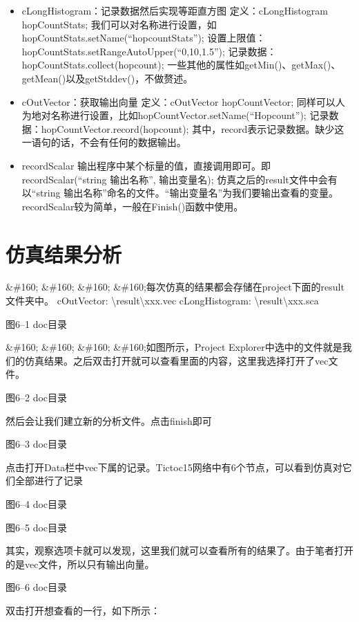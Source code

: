 \begin{itemize}
\item cLongHistogram：记录数据然后实现等距直方图 
定义：cLongHistogram hopCountStats;
我们可以对名称进行设置，如hopCountStats.setName(“hopcountStats”);
设置上限值：hopCountStats.setRangeAutoUpper(“0,10,1.5”);
记录数据：hopCountStats.collect(hopcount);
一些其他的属性如getMin()、getMax()、getMean()以及getStddev()，不做赘述。

\item cOutVector：获取输出向量
定义：cOutVector hopCountVector;
同样可以人为地对名称进行设置，比如hopCountVector.setName(“Hopcount”);
记录数据：hopCountVector.record(hopcount);
其中，record表示记录数据。缺少这一语句的话，不会有任何的数据输出。

\item recordScalar
输出程序中某个标量的值，直接调用即可。即
recordScalar(“string 输出名称”, 输出变量名);
仿真之后的result文件中会有以“string 输出名称”命名的文件。“输出变量名”为我们要输出查看的变量。recordScalar较为简单，一般在Finish()函数中使用。

\end{itemize}

\section{仿真结果分析}
\label{仿真结果分析}

\&\#160; \&\#160; \&\#160; \&\#160;每次仿真的结果都会存储在project下面的result文件夹中。
cOutVector: \textbackslash{}result\textbackslash{}xxx.vec
cLongHistogram: \textbackslash{}result\textbackslash{}xxx.sca

图6--1 doc目录

\&\#160; \&\#160; \&\#160; \&\#160;如图所示，Project Explorer中选中的文件就是我们的仿真结果。之后双击打开就可以查看里面的内容，这里我选择打开了vec文件。

图6--2 doc目录

然后会让我们建立新的分析文件。点击finish即可

图6--3 doc目录

点击打开Data栏中vec下属的记录。Tictoc15网络中有6个节点，可以看到仿真对它们全部进行了记录

图6--4 doc目录

图6--5 doc目录

其实，观察选项卡就可以发现，这里我们就可以查看所有的结果了。由于笔者打开的是vec文件，所以只有输出向量。

图6--6 doc目录

双击打开想查看的一行，如下所示：

